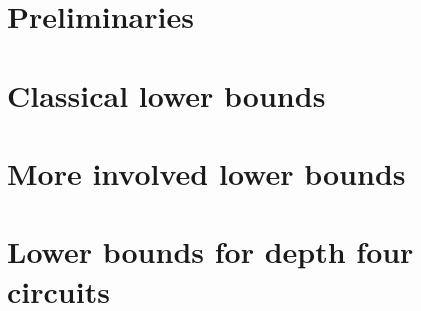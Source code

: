 



\tableofcontents



\part{Preliminaries}










\part{Classical lower bounds}





\part{More involved lower bounds}





\part{Lower bounds for depth four circuits}










